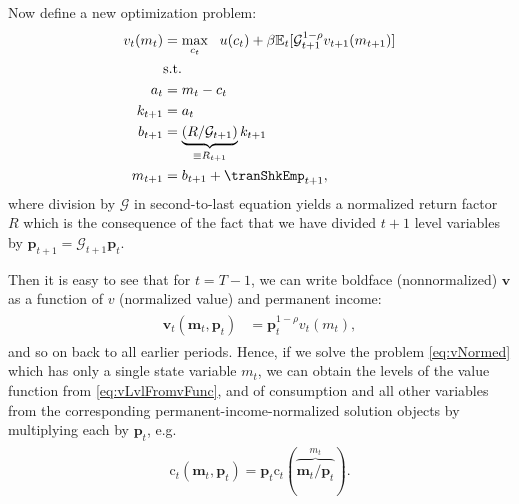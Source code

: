 \documentclass[titlepage, headings=optiontotocandhead]{econtex}
\newcommand{\ifpseudo}{\ifthenelse{\boolean{pseudocode}}}
\begin{document}
Now define a new optimization problem:
  \begin{equation}\begin{gathered}\begin{aligned}
        v_{t}(m_{t}) & = \max_{{c}_{t}} ~~ u(c_{t})+{\beta}{\mathbb{E}}_{t}[ \mathcal{G}_{t+1}^{1-\rho}v_{t+1}(m_{t+1})] \label{eq:vNormed}                   \\
                                         & \text{s.t.}                                                                                 \\
        a_{t}                       & = m_{t}-c_{t}                                                                     \\
        k_{t+1}                     & = a_{t}                                                                                \\
        b_{t+1}                     & = \underbrace{\left(R/\mathcal{G}_{t+1}\right)}_{\equiv R_{t+1}}k_{t+1} \\
        m_{t+1}                        & = b_{t+1}+\tranShkEmp_{t+1},
      \end{aligned}\end{gathered}\end{equation}
where division by $\mathcal{G}$ in second-to-last equation yields a normalized return factor $R$ which is the consequence of the fact that we have divided $t+1$ level variables by $\mathbf{p}_{t+1}=\mathcal{G}_{t+1}\mathbf{p}_{t}$.

\ifpseudo{ %
\nopagebreak
  }{}
  
Then it is easy to see that for $t=T-1$, we can write boldface (nonnormalized) $\mathbf{v}$ as a function of $v$ (normalized value) and permanent income:
\begin{equation}\begin{gathered}\begin{aligned}
      \mathbf{v}_{t}(\mathbf{m}_{t},\mathbf{p}_{t}) & =  \mathbf{p}_{t}^{1-\rho}v_{t}(m_{t}), \label{eq:vLvlFromvFunc}
    \end{aligned}\end{gathered}\end{equation}
and so on back to all earlier periods.  Hence, if we solve the problem \eqref{eq:vNormed} which has only a single state variable $m_{t}$, we can obtain the levels of the value function from \eqref{eq:vLvlFromvFunc}, and of consumption and all other variables from the corresponding permanent-income-normalized solution objects by multiplying each by $\mathbf{p}_{t}$, e.g.\
\begin{equation*}\begin{gathered}\begin{aligned}
  \mathrm{c}_{t}(\mathbf{m}_{t},\mathbf{p}_{t})=\mathbf{p}_{t}\mathrm{c}_{t}(\overbrace{\mathbf{m}_{t}/\mathbf{p}_{t}}^{m_{t}}).
    \end{aligned}\end{gathered}\end{equation*}
\end{document}
